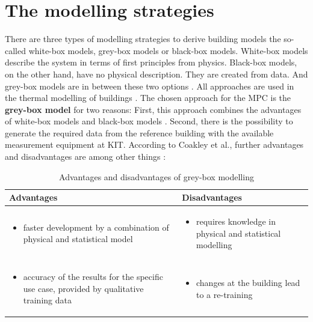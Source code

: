     \section{The modelling strategies}
    \label{ModellingStrategies}
    There are three types of modelling strategies to derive building models the so-called white-box models, grey-box models or black-box models. White-box models describe the system in terms of first principles from physics. Black-box models, on the other hand, have no physical description. They are created from data. And grey-box models are in between these two options \cite{Statusseminar.ForschungfurEnergieoptimiertesBauen.2009}. All approaches are used in the thermal modelling of buildings \cite{Kramer.2012}.
    \newline
    The chosen approach for the MPC is the \textbf{grey-box model} for two reasons: First, this approach combines the advantages of white-box models and black-box models \cite{EstradaFlores.2006}. Second, there is the possibility to generate the required data from the reference building with the available measurement equipment at KIT. According to Coakley et al., further advantages and disadvantages are among other things \cite{Coakley.2014}:
    \begin{table}[h!]
    \label{Advantages and disadvantages of grey-box modelling}
        \centering
        \begin{tabular}{p{7.3cm} | p{7.3cm}}
        \hline
          Advantages  &  Disadvantages\\
        \hline
        \begin{itemize}
            \item faster development by a combination of physical and statistical model
        \end{itemize}
      & \begin{itemize}
            \item requires knowledge in physical and statistical modelling 
        \end{itemize}\\
     \begin{itemize}
            \item accuracy of the results for the specific use case, provided by qualitative training data
        \end{itemize} & \begin{itemize}
            \item changes at the building lead to a re-training
        \end{itemize}\\
        \end{tabular}
        \caption {Advantages and disadvantages of grey-box modelling}
    \end{table}
